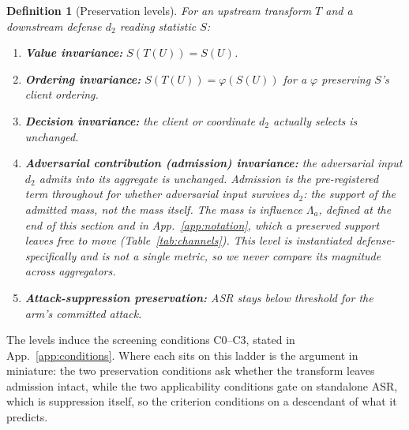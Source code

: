 \documentclass{article}
\newtheorem{definition}{Definition}
\begin{document}
\begin{definition}[Preservation levels]
\label{def:levels}
For an upstream transform $T$ and a downstream defense $d_2$ reading statistic $S$:
\begin{enumerate}[noitemsep,topsep=2pt,label=(P\arabic*)]
\item \textbf{Value invariance:} $S(T(U)) = S(U)$.
\item \textbf{Ordering invariance:} $S(T(U)) = \varphi(S(U))$ for a $\varphi$ preserving $S$'s client ordering.
\item \textbf{Decision invariance:} the client or coordinate $d_2$ actually selects is unchanged.
\item \textbf{Adversarial contribution (admission) invariance:} the adversarial input $d_2$ admits into its aggregate is unchanged. \emph{Admission} is the pre-registered term throughout for whether adversarial input survives $d_2$: the support of the admitted mass, not the mass itself. The mass is influence $\Lambda_a$, defined at the end of this section and in App.~\ref{app:notation}, which a preserved support leaves free to move (Table~\ref{tab:channels}). This level is instantiated defense-specifically and is not a single metric, so we never compare its magnitude across aggregators.
\item \textbf{Attack-suppression preservation:} ASR stays below threshold for the arm's committed attack.
\end{enumerate}
\end{definition}

\noindent The levels induce the screening conditions C0--C3, stated in App.~\ref{app:conditions}. Where each sits on this ladder is the argument in miniature: the two preservation conditions ask whether the transform leaves admission intact, while the two applicability conditions gate on standalone ASR, which is suppression itself, so the criterion conditions on a descendant of what it predicts.
\end{document}
